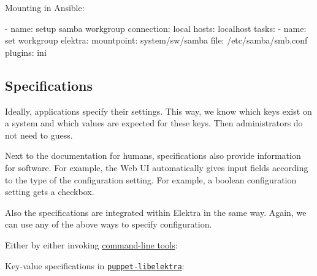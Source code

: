 

Mounting in Ansible\+:


\begin{DoxyCode}
- name: setup samba workgroup
  connection: local
  hosts: localhost
  tasks:
    - name: set workgroup
    elektra:
      mountpoint: system/sw/samba
      file: /etc/samba/smb.conf
      plugins: ini
\end{DoxyCode}


\subsection*{Specifications}

Ideally, applications specify their settings. This way, we know which keys exist on a system and which values are expected for these keys. Then administrators do not need to guess.

Next to the documentation for humans, specifications also provide information for software. For example, the Web UI automatically gives input fields according to the type of the configuration setting. For example, a boolean configuration setting gets a checkbox.

Also the specifications are integrated within Elektra in the same way. Again, we can use any of the above ways to specify configuration.

Either by either invoking \hyperlink{doc_help_kdb_md}{command-\/line tools}\+:




Key-\/value specifications in \href{https://puppet.libelektra.org}{\tt puppet-\/libelektra}\+:




